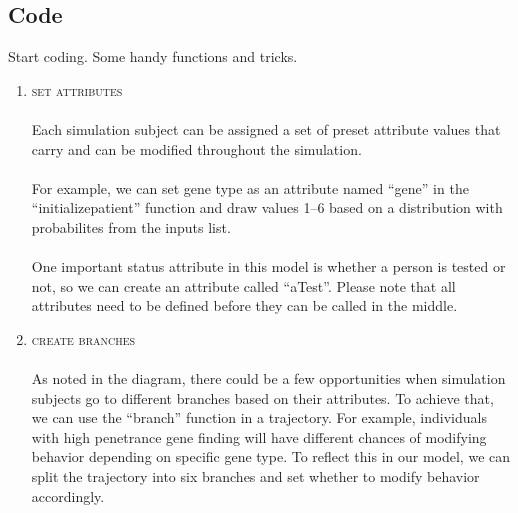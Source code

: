 \documentclass{article}
\begin{document}
\subsection{Code}
Start coding. Some handy functions and tricks. \\
\begin{enumerate}

\item
\textsc{set attributes} \\\\
Each simulation subject can be assigned a set of preset attribute values that carry and can be modified throughout the simulation.\\\\
For example, we can set gene type as an attribute named ``gene'' in the ``initialize\textunderscore patient'' function and draw values 1--6 based on a distribution with probabilites from the inputs list. \\\\
One important status attribute in this model is whether a person is tested or not, so we can create an attribute called ``aTest''. Please note that all attributes need to be defined before they can be called in the middle. 

\item
\textsc{create branches} \\\\
As noted in the diagram, there could be a few opportunities when simulation subjects go to different branches based on their attributes. To achieve that, we can use the ``branch'' function in a trajectory. For example, individuals with high penetrance gene finding will have different chances of modifying behavior depending on specific gene type. To reflect this in our model, we can split the trajectory into six branches and set whether to modify behavior accordingly.


\end{enumerate}
\end{document}
